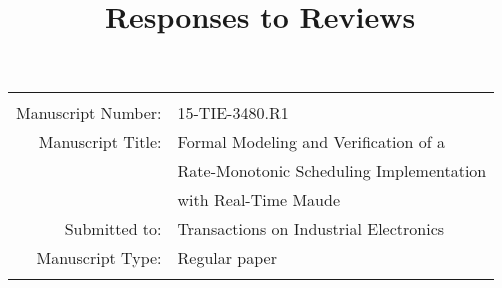 \documentclass[12pt,onecolumn]{IEEEtranTIE}
\begin{document}
\title{Responses to Reviews}
\date{}

\maketitle
\vspace{-30pt}
\begin{center}
  \begin{tabular}{r l}
    \hline\hline
    & \\
    Manuscript Number: & 15-TIE-3480.R1\\
    Manuscript Title: & Formal Modeling and Verification of a \\
    & Rate-Monotonic Scheduling Implementation \\
    & with Real-Time Maude \\
    Submitted to: & Transactions on Industrial Electronics \\
    Manuscript Type: & Regular paper \\
    & \\
    \hline\hline
  \end{tabular}
  \bigskip
\end{center}

\newcommand{\by}{$\rightarrow$ }
\end{document}
